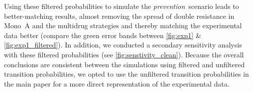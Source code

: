 Using these filtered probabilities to simulate the \textit{prevention}~scenario leads to better-matching results, almost removing the spread of double resistance in Mono~A and the multidrug strategies and thereby matching the experimental data better (compare the green error bands between \autoref{fig:exp1} \& \autoref{fig:exp1_filtered}). 
In addition, we conducted a secondary sensitivity analysis with these filtered probabilities (see \autoref{fig:senstivity_clean}). 
Because the overall conclusions are consistent between the simulations using filtered and unfiltered transition probabilities, we opted to use the unfiltered transition probabilities in the main paper for a more direct representation of the experimental data. 

